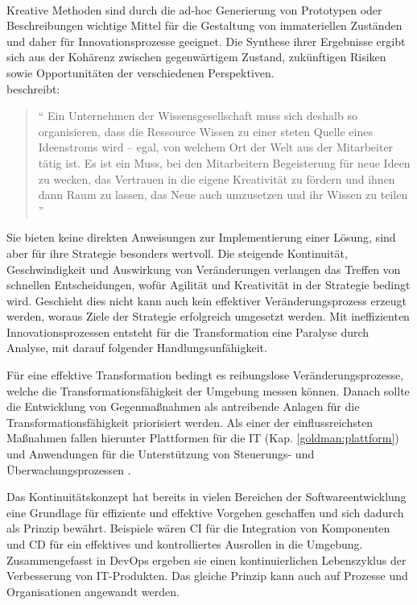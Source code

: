 \\
Kreative Methoden sind durch die ad-hoc Generierung von Prototypen oder Beschreibungen wichtige Mittel für die Gestaltung von immateriellen Zuständen und daher für Innovationsprozesse geeignet. Die Synthese ihrer Ergebnisse ergibt sich aus der Kohärenz zwischen gegenwärtigem Zustand, zukünftigen Risiken sowie Opportunitäten der verschiedenen Perspektiven. 
\medskip
\\
\citet{Ganswindt2006} beschreibt:
\begin{quote}
    \enquote{
    Ein Unternehmen der Wissensgesellschaft muss sich deshalb so organisieren, dass die Ressource Wissen zu einer steten Quelle eines Ideenstroms wird – egal, von welchem Ort der Welt aus der Mitarbeiter tätig ist. Es ist ein Muss, bei den Mitarbeitern Begeisterung für neue Ideen zu wecken, das Vertrauen in die eigene Kreativität zu fördern und ihnen dann Raum zu lassen, das Neue auch umzusetzen und ihr Wissen zu teilen
    }
\end{quote}
\medskip
Sie bieten keine direkten Anweisungen zur Implementierung einer Lösung, sind aber für ihre Strategie besonders wertvoll. Die steigende Kontinuität, Geschwindigkeit und Auswirkung von Veränderungen verlangen das Treffen von schnellen Entscheidungen, wofür Agilität und Kreativität in der Strategie bedingt wird. Geschieht dies nicht kann auch kein effektiver Veränderungsprozess erzeugt werden, woraus Ziele der Strategie erfolgreich umgesetzt werden. Mit ineffizienten Innovationsprozessen entsteht für die Transformation eine Paralyse durch Analyse, mit darauf folgender Handlungsunfähigkeit. 

Für eine effektive Transformation bedingt es reibungslose Veränderungsprozesse, welche die Transformationsfähigkeit der Umgebung messen können. Danach sollte die Entwicklung von Gegenmaßnahmen als antreibende Anlagen für die Transformationsfähigkeit priorisiert werden. Als einer der einflussreichsten Maßnahmen fallen hierunter Plattformen für die IT (Kap. \ref{goldman:plattform}) und Anwendungen für die Unterstützung von Steuerungs- und Überwachungsprozessen \cite{Bussmann2006}.

Das Kontinuitätskonzept hat bereits in vielen Bereichen der Softwareentwicklung eine Grundlage für effiziente und effektive Vorgehen geschaffen und sich dadurch als Prinzip bewährt. Beispiele wären \ac{CI} für die Integration von Komponenten und \ac{CD} für ein effektives und kontrolliertes Ausrollen in die Umgebung. Zusammengefasst in DevOps ergeben sie einen kontinuierlichen Lebenszyklus der Verbesserung von IT-Produkten. Das gleiche Prinzip kann auch auf Prozesse und Organisationen angewandt werden.

